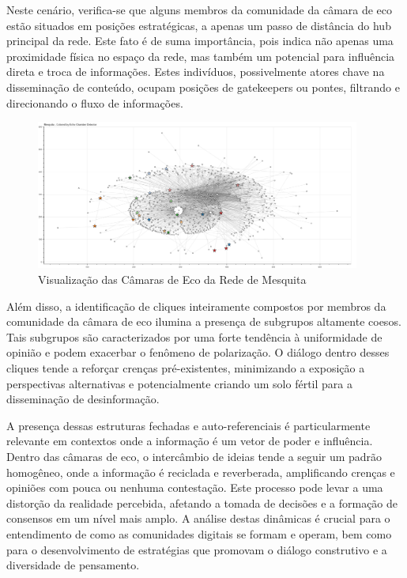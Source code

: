 Neste cenário, verifica-se que alguns membros da comunidade da câmara de eco estão situados em posições estratégicas, a apenas um passo de distância do hub principal da rede. Este fato é de suma importância, pois indica não apenas uma proximidade física no espaço da rede, mas também um potencial para influência direta e troca de informações. Estes indivíduos, possivelmente atores chave na disseminação de conteúdo, ocupam posições de gatekeepers ou pontes, filtrando e direcionando o fluxo de informações.

\begin{figure}[htb]
	\centering
	\includegraphics[width=0.95\textwidth]{images/echo_chambers_mesquita.png}
	\caption{Visualização das Câmaras de Eco da Rede de Mesquita}
	\label{fig:echo_chambers_mesquita}
\end{figure}

Além disso, a identificação de cliques inteiramente compostos por membros da comunidade da câmara de eco ilumina a presença de subgrupos altamente coesos. Tais subgrupos são caracterizados por uma forte tendência à uniformidade de opinião e podem exacerbar o fenômeno de polarização. O diálogo dentro desses cliques tende a reforçar crenças pré-existentes, minimizando a exposição a perspectivas alternativas e potencialmente criando um solo fértil para a disseminação de desinformação.

A presença dessas estruturas fechadas e auto-referenciais é particularmente relevante em contextos onde a informação é um vetor de poder e influência. Dentro das câmaras de eco, o intercâmbio de ideias tende a seguir um padrão homogêneo, onde a informação é reciclada e reverberada, amplificando crenças e opiniões com pouca ou nenhuma contestação. Este processo pode levar a uma distorção da realidade percebida, afetando a tomada de decisões e a formação de consensos em um nível mais amplo. A análise destas dinâmicas é crucial para o entendimento de como as comunidades digitais se formam e operam, bem como para o desenvolvimento de estratégias que promovam o diálogo construtivo e a diversidade de pensamento.

